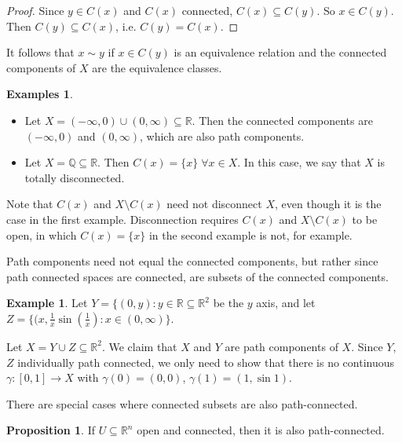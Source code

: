 \documentclass[a4paper,11pt]{article}
\theoremstyle{definition}
\newtheorem*{prop}{Proposition}
\newtheorem*{ex}{Example}
\newtheorem*{exs}{Examples}
\numberwithin{equation}{section}
\begin{document}
\begin{proof}
Since $y\in C(x)$ and $C(x)$ connected, $C(x)\subseteq C(y)$. So $x\in C(y)$. Then $C(y)\subseteq C(x)$, i.e. $C(y)=C(x)$.
\end{proof}

It follows that $x\sim y$ if $x\in C(y)$ is an equivalence relation and the connected components of $X$ are the equivalence classes.

\begin{exs}
\leavevmode
\begin{itemize}
    \item Let $X=(-\infty,0)\cup(0,\infty)\subseteq\mathbb{R}$. Then the connected components are $(-\infty,0)$ and $(0,\infty)$, which are also path components.
    \item Let $X=\mathbb{Q}\subseteq\mathbb{R}$. Then $C(x)=\{x\}\;\forall x\in X$. In this case, we say that $X$ is totally disconnected.
\end{itemize}
\end{exs}

Note that $C(x)$ and $X\setminus C(x)$ need not disconnect $X$, even though it is the case in the first example. Disconnection requires $C(x)$ and $X\setminus C(x)$ to be open, in which $C(x)=\{x\}$ in the second example is not, for example.

Path components need not equal the connected components, but rather since path connected spaces are connected, are subsets of the connected components.

\begin{ex}
Let $Y=\{(0,y):y\in\mathbb{R}\subseteq\mathbb{R}^2$ be the $y$ axis, and let $Z=\{(x,\frac{1}{x}\sin\left(\frac{1}{x}\right):x\in(0,\infty)\}$. 

Let $X=Y\cup Z\subseteq\mathbb{R}^2$. We claim that $X$ and $Y$ are path components of $X$. Since $Y$, $Z$ individually path connected, we only need to show that there is no continuous $\gamma:[0,1]\rightarrow X$ with $\gamma(0)=(0,0)$, $\gamma(1)=(1,\sin 1)$.
\end{ex}


There are special cases where connected subsets are also path-connected.

\begin{prop}
    If $U\subseteq\mathbb{R}^n$ open and connected, then it is also path-connected.
\end{prop}
\end{document}
